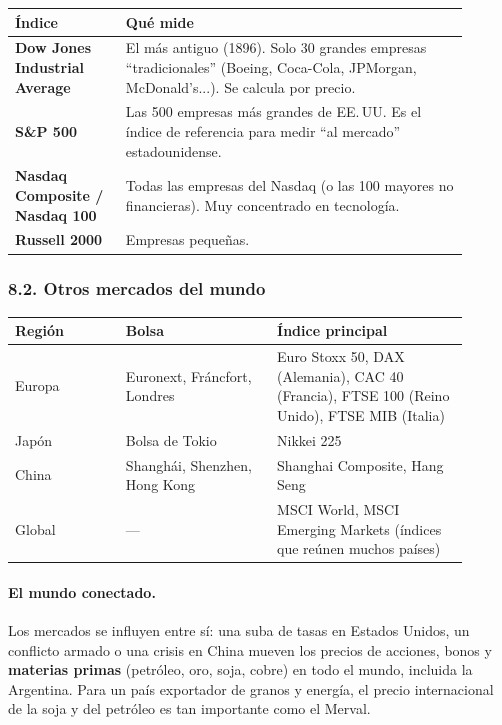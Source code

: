 \begin{center}
\small
\begin{tabular}{|p{0.22\linewidth}|p{0.68\linewidth}|}
\hline
\textbf{Índice} & \textbf{Qué mide} \\ \hline
\textbf{Dow Jones Industrial Average} & El más antiguo (1896). Solo 30 grandes empresas
``tradicionales'' (Boeing, Coca-Cola, JPMorgan, McDonald's...). Se calcula por precio. \\ \hline
\textbf{S\&P 500} & Las 500 empresas más grandes de EE.\,UU. Es el índice de referencia para medir
``al mercado'' estadounidense. \\ \hline
\textbf{Nasdaq Composite / Nasdaq 100} & Todas las empresas del Nasdaq (o las 100 mayores no
financieras). Muy concentrado en tecnología. \\ \hline
\textbf{Russell 2000} & Empresas pequeñas. \\ \hline
\end{tabular}
\end{center}

\subsubsection*{8.2. Otros mercados del mundo}
\begin{center}
\small
\begin{tabular}{|p{0.22\linewidth}|p{0.30\linewidth}|p{0.38\linewidth}|}
\hline
\textbf{Región} & \textbf{Bolsa} & \textbf{Índice principal} \\ \hline
Europa & Euronext, Fráncfort, Londres & Euro Stoxx 50, DAX (Alemania), CAC 40 (Francia),
FTSE 100 (Reino Unido), FTSE MIB (Italia) \\ \hline
Japón & Bolsa de Tokio & Nikkei 225 \\ \hline
China & Shanghái, Shenzhen, Hong Kong & Shanghai Composite, Hang Seng \\ \hline
Global & --- & MSCI World, MSCI Emerging Markets (índices que reúnen muchos países) \\ \hline
\end{tabular}
\end{center}

\paragraph*{El mundo conectado.} Los mercados se influyen entre sí: una suba de tasas en
Estados Unidos, un conflicto armado o una crisis en China mueven los precios de acciones,
bonos y \textbf{materias primas} (petróleo, oro, soja, cobre) en todo el mundo, incluida la
Argentina. Para un país exportador de granos y energía, el precio internacional de la soja y
del petróleo es tan importante como el Merval.

